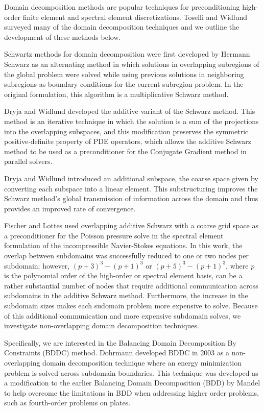 Domain decomposition methods are popular techniques for preconditioning high-order finite element and spectral element discretizations.
Toselli and Widlund surveyed many of the domain decomposition techniques \cite{toselli2005domain} and we outline the development of these methods below.

Schwartz methods for domain decomposition were first developed by Hermann Schwarz \cite{schwarz1972gesammelte} as an alternating method in which solutions in overlapping subregions of the global problem were solved while using previous solutions in neighboring subregions as boundary conditions for the current subregion problem.
In the original formulation, this algorithm is a multiplicative Schwarz method.

Dryja and Widlund \cite{widlund1987additive,dryja1989additive} developed the additive variant of the Schwarz method.
This method is an iterative technique in which the solution is a sum of the projections into the overlapping subspaces, and this modification preserves the symmetric positive-definite property of PDE operators, which allows the additive Schwarz method to be used as a preconditioner for the Conjugate Gradient method in parallel solvers.

Dryja and Widlund introduced an additional subspace, the coarse space given by converting each subspace into a linear element.
This substructuring improves the Schwarz method's global transmission of information across the domain and thus provides an improved rate of convergence. 

Fischer and Lottes \cite{fischer1997overlapping,fischer2005hybrid} used overlapping additive Schwarz with a coarse grid space as a preconditioner for the Poisson pressure solve in the spectral element formulation of the incompressible Navier-Stokes equations.
In this work, the overlap between subdomains was successfully reduced to one or two nodes per subdomain; however, $\left( p + 3 \right)^3 - \left( p + 1 \right)^3$ or $\left( p + 5 \right)^3 - \left( p + 1 \right)^3$, where $p$ is the polynomial order of the high-order or spectral element basis, can be a rather substantial number of nodes that require additional communication across subdomains in the additive Schwarz method.
Furthermore, the increase in the subdomain sizes makes each sudomain problem more expensive to solve.
Because of this additional communication and more expensive subdomain solves, we investigate non-overlapping domain decomposition techniques.

Specifically, we are interested in the Balancing Domain Decomposition By Constraints (BDDC) method.
Dohrmann \cite{dohrmann2003preconditioner} developed BDDC in 2003 as a non-overlapping domain decomposition technique where an energy minimization problem is solved across subdomain boundaries.
This technique was developed as a modification to the earlier Balancing Domain Decomposition (BDD) by Mandel \cite{mandel1993balancing} to help overcome the limitations in BDD when addressing higher order problems, such as fourth-order problems on plates.

